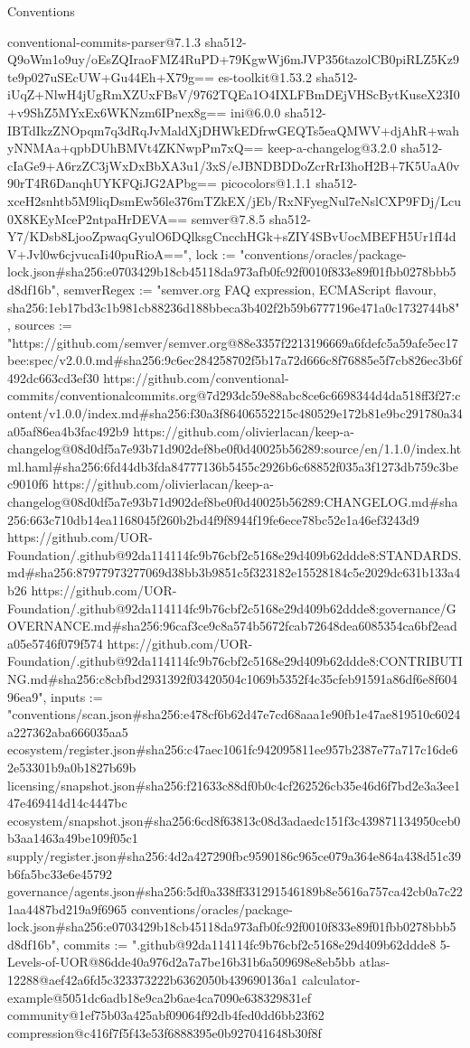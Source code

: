 \begin{lexlean}{Conventions}
\begin{semanticmodule}
{conventional-commits-parser@7.1.3 sha512-Q9oWm1o9uy/oEsZQIraoFMZ4RuPD+79KgwWj6mJVP356tazolCB0piRLZ5Kz9te9p027uSEcUW+Gu44Eh+X79g== es-toolkit@1.53.2 sha512-iUqZ+NlwH4jUgRmXZUxFBsV/9762TQEa1O4IXLFBmDEjVHScBytKuseX23I0+v9ShZ5MYxEx6WKNzm6IPnex8g== ini@6.0.0 sha512-IBTdIkzZNOpqm7q3dRqJvMaldXjDHWkEDfrwGEQTs5eaQMWV+djAhR+wahyNNMAa+qpbDUhBMVt4ZKNwpPm7xQ== keep-a-changelog@3.2.0 sha512-cIaGe9+A6rzZC3jWxDxBbXA3u1/3xS/eJBNDBDDoZcrRrI3hoH2B+7K5UaA0v90rT4R6DanqhUYKFQiJG2APbg== picocolors@1.1.1 sha512-xceH2snhtb5M9liqDsmEw56le376mTZkEX/jEb/RxNFyegNul7eNslCXP9FDj/Lcu0X8KEyMceP2ntpaHrDEVA== semver@7.8.5 sha512-Y7/KDsb8LjooZpwaqGyulO6DQlksgCncchHGk+sZIY4SBvUocMBEFH5Ur1fI4dV+Jvl0w6cjvucaIi40puRioA==", lock := "conventions/oracles/package-lock.json#sha256:e0703429b18cb45118da973afb0fc92f0010f833e89f01fbb0278bbb5d8df16b", semverRegex := "semver.org FAQ expression, ECMAScript flavour, sha256:1eb17bd3c1b981cb88236d188bbeca3b402f2b59b6777196e471a0c1732744b8", sources := "https://github.com/semver/semver.org@88e3357f2213196669a6fdefc5a59afe5ec17bee:spec/v2.0.0.md#sha256:9c6ec284258702f5b17a72d666c8f76885e5f7cb826ec3b6f492dc663cd3ef30 https://github.com/conventional-commits/conventionalcommits.org@7d293dc59e88abc8ce6c6698344d4da518ff3f27:content/v1.0.0/index.md#sha256:f30a3f86406552215c480529e172b81e9bc291780a34a05af86ea4b3fac492b9 https://github.com/olivierlacan/keep-a-changelog@08d0df5a7e93b71d902def8be0f0d40025b56289:source/en/1.1.0/index.html.haml#sha256:6fd44db3fda84777136b5455c2926b6c68852f035a3f1273db759c3bec9010f6 https://github.com/olivierlacan/keep-a-changelog@08d0df5a7e93b71d902def8be0f0d40025b56289:CHANGELOG.md#sha256:663c710db14ea1168045f260b2bd4f9f8944f19fe6ece78bc52e1a46ef3243d9 https://github.com/UOR-Foundation/.github@92da114114fc9b76cbf2c5168e29d409b62ddde8:STANDARDS.md#sha256:87977973277069d38bb3b9851c5f323182e15528184c5e2029dc631b133a4b26 https://github.com/UOR-Foundation/.github@92da114114fc9b76cbf2c5168e29d409b62ddde8:governance/GOVERNANCE.md#sha256:96caf3ce9c8a574b5672fcab72648dea6085354ca6bf2eada05e5746f079f574 https://github.com/UOR-Foundation/.github@92da114114fc9b76cbf2c5168e29d409b62ddde8:CONTRIBUTING.md#sha256:c8cbfbd2931392f03420504c1069b5352f4c35cfeb91591a86df6e8f60496ea9", inputs := "conventions/scan.json#sha256:e478cf6b62d47e7cd68aaa1e90fb1e47ae819510c6024a227362aba666035aa5 ecosystem/register.json#sha256:c47aec1061fc942095811ee957b2387e77a717c16de62e53301b9a0b1827b69b licensing/snapshot.json#sha256:f21633c88df0b0c4cf262526cb35e46d6f7bd2e3a3ee147e469414d14c4447bc ecosystem/snapshot.json#sha256:6cd8f63813c08d3adaedc151f3c439871134950ceb0b3aa1463a49be109f05c1 supply/register.json#sha256:4d2a427290fbc9590186c965ce079a364e864a438d51c39b6fa5bc33e6e45792 governance/agents.json#sha256:5df0a338ff331291546189b8e5616a757ca42cb0a7c221aa4487bd219a9f6965 conventions/oracles/package-lock.json#sha256:e0703429b18cb45118da973afb0fc92f0010f833e89f01fbb0278bbb5d8df16b", commits := ".github@92da114114fc9b76cbf2c5168e29d409b62ddde8 5-Levels-of-UOR@86dde40a976d2a7a7be16b31b6a509698e8eb5bb atlas-12288@aef42a6fd5c323373222b6362050b439690136a1 calculator-example@5051dc6adb18e9ca2b6ae4ca7090e638329831ef community@1ef75b03a425abf09064f92db4fed0dd6bb23f62 compression@c416f7f5f43e53f6888395e0b927041648b30f8f }
\end{semanticmodule}
\end{lexlean}
